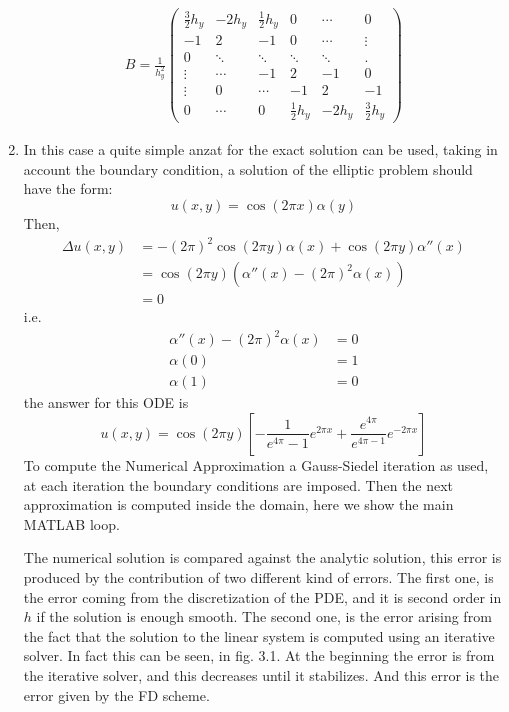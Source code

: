 \documentclass{article}
\numberwithin{equation}{section}
\begin{document}
\begin{enumerate}[label=(\alph*)]
\begin{align*}
            B = \frac{1}{h_y^2}\begin{pmatrix}
                \frac{3}{2}h_y & -2h_y & \frac{1}{2}h_y & 0 & \cdots & 0\\
                -1 & 2 & -1 & 0 & \cdots & \vdots\\
                0 & \ddots & \ddots & \ddots & \ddots & .\\
                \vdots & \cdots & -1 & 2 & -1 & 0\\
                \vdots & 0 & \cdots & -1 & 2 & -1 \\
                0 & \cdots & 0 & \frac{1}{2}h_y & -2h_y & \frac{3}{2}h_y
            \end{pmatrix}
        \end{align*}
        \item In this case a quite simple anzat for the exact solution can be used, taking in account the boundary condition, a solution of the elliptic problem should have the form:
            $$u(x,y) = \cos{(2\pi x)}\alpha(y)$$
        Then,\begin{align*}
            \Delta u(x,y) 
            & = -(2\pi)^2\cos{(2\pi y)}\alpha(x) + \cos{(2\pi y)}\alpha'' (x)\\
            & = \cos{(2\pi y)}(\alpha'' (x) - (2\pi)^2\alpha(x))\\
            & = 0
        \end{align*}
        i.e.
        \begin{align*}
            \alpha'' (x) - (2\pi)^2\alpha(x) &= 0\\
            \alpha(0) & = 1\\
            \alpha(1) & = 0
        \end{align*}
        the answer for this ODE is
            $$u(x,y) = \cos{(2\pi y)}\left[-\frac{1}{e^{4\pi}-1}e^{2\pi x} + \frac{e^{4\pi}}{e^{4\pi -1}}e^{-2\pi x}\right]$$
        To compute the Numerical Approximation a Gauss-Siedel iteration as used, at each iteration the boundary conditions are imposed. Then the next approximation is computed inside the domain, here we show the main MATLAB loop.
        
        The numerical solution is compared against the analytic solution, this error is produced by the contribution of two different kind of errors. The first one, is the error coming from the discretization of the PDE, and it is second order in $h$ if the solution is enough smooth. The second one, is the error arising from the fact that the solution to the linear system is computed using an iterative solver. In fact this can be seen, in fig. 3.1. At the beginning the error is from the iterative solver, and this decreases until it stabilizes. And this error is the error given by the FD scheme.

\end{enumerate}
\end{document}
